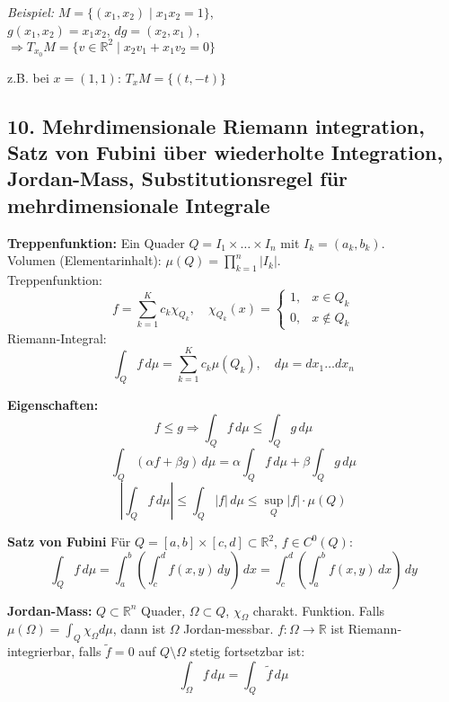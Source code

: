 \vspace{0.5em}

\textit{Beispiel:} $M = \{(x_1,x_2) \mid x_1x_2 = 1\}$,\\
$g(x_1,x_2) = x_1x_2$, $dg = (x_2, x_1)$,\\
$\Rightarrow T_{x_0}M = \{v \in \mathbb{R}^2 \mid x_2v_1 + x_1v_2 = 0\}$

z.B. bei $x = (1,1)$: $T_xM = \{(t, -t)\}$



\subsection{10. Mehrdimensionale Riemann integration, Satz von Fubini über wiederholte Integration, Jordan-Mass, Substitutionsregel für mehrdimensionale Integrale}

\textbf{Treppenfunktion:}
Ein Quader \( Q = I_1 \times \dots \times I_n \) mit \( I_k = (a_k, b_k) \). \\
Volumen (Elementarinhalt): \( \mu(Q) = \prod_{k=1}^n |I_k| \). \\
Treppenfunktion:
\[
f = \sum_{k=1}^K c_k \chi_{Q_k}, \quad
\chi_{Q_k}(x) = \begin{cases}
1, & x \in Q_k \\
0, & x \notin Q_k
\end{cases}
\]
Riemann-Integral:
\[
\int_Q f\,d\mu = \sum_{k=1}^K c_k \mu(Q_k), \quad
d\mu = dx_1 \dots dx_n
\]

\vspace{0.5em}
\textbf{Eigenschaften:}
\[
f \leq g \Rightarrow \int_Q f\,d\mu \leq \int_Q g\,d\mu
\]
\[
\int_Q (\alpha f + \beta g)\,d\mu = \alpha \int_Q f\,d\mu + \beta \int_Q g\,d\mu
\]
\[
\left| \int_Q f\,d\mu \right| \leq \int_Q |f|\,d\mu \leq \sup_Q |f| \cdot \mu(Q)
\]

\vspace{0.5em}
\textbf{Satz von Fubini}
Für \( Q = [a,b] \times [c,d] \subset \mathbb{R}^2 \), \( f \in C^0(Q) \):
\[
\int_Q f\,d\mu = \int_a^b \left( \int_c^d f(x,y)\,dy \right)\,dx
= \int_c^d \left( \int_a^b f(x,y)\,dx \right)\,dy
\]

\vspace{0.5em}
\textbf{Jordan-Mass:}  
\( Q \subset \mathbb{R}^n \) Quader, \( \Omega \subset Q \), \( \chi_\Omega \) charakt. Funktion.  
Falls \( \mu(\Omega) = \int_Q \chi_\Omega d\mu \), dann ist \( \Omega \) Jordan-messbar.  
\( f : \Omega \to \mathbb{R} \) ist Riemann-integrierbar, falls \( \tilde{f} = 0 \) auf \( Q \setminus \Omega \) stetig fortsetzbar ist:
\[
\int_\Omega f\,d\mu = \int_Q \tilde{f}\,d\mu
\]

